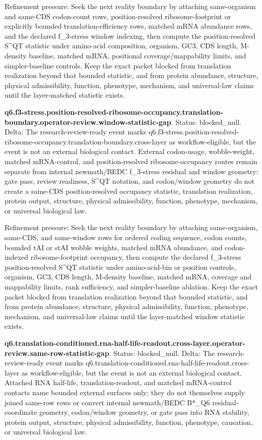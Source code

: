 Refinement pressure: Seek the next reality boundary by attaching same-organism and same-CDS codon-count rows, position-resolved ribosome-footprint or explicitly bounded translation-efficiency rows, matched mRNA abundance rows, and the declared f\_3-stress window indexing, then compute the position-resolved S\textasciicircum{}QT statistic under amino-acid composition, organism, GC3, CDS length, M-density baseline, matched mRNA, positional coverage/mappability limits, and simpler-baseline controls. Keep the exact packet blocked from translation realization beyond that bounded statistic, and from protein abundance, structure, physical admissibility, function, phenotype, mechanism, and universal-law claims until the layer-matched statistic exists.

\textbf{q6.f3-stress.position-resolved-ribosome-occupancy.translation-boundary.operator-review.window-statistic-gap}. Status: blocked\_null. Delta: The research-review-ready event marks q6.f3-stress.position-resolved-ribosome-occupancy.translation-boundary.cross-layer as workflow-eligible, but the event is not an external biological contact. External codon-usage, wobble-weight, matched mRNA-control, and position-resolved ribosome-occupancy routes remain separate from internal newmath/BEDC f\_3-stress residual and window geometry: gate pass, review readiness, S\textasciicircum{}QT notation, and codon/window geometry do not create a same-CDS position-resolved occupancy statistic, translation realization, protein output, structure, physical admissibility, function, phenotype, mechanism, or universal biological law.

Refinement pressure: Seek the next reality boundary by attaching same-organism, same-CDS, and same-window rows for ordered coding sequence, codon counts, bounded tAI or stAI wobble weights, matched mRNA abundance, and codon-indexed ribosome-footprint occupancy, then compute the declared f\_3-stress position-resolved S\textasciicircum{}QT statistic under amino-acid-bin or position controls, organism, GC3, CDS length, M-density baseline, matched mRNA, coverage and mappability limits, rank sufficiency, and simpler-baseline ablation. Keep the exact packet blocked from translation realization beyond that bounded statistic, and from protein abundance, structure, physical admissibility, function, phenotype, mechanism, and universal-law claims until the layer-matched window statistic exists.

\textbf{q6.translation-conditioned.rna-half-life-readout.cross-layer.operator-review.same-row-statistic-gap}. Status: blocked\_null. Delta: The research-review-ready event marks q6.translation-conditioned.rna-half-life-readout.cross-layer as workflow-eligible, but the event is not an external biological contact. Attached RNA half-life, translation-readout, and matched mRNA-control contacts name bounded external surfaces only; they do not themselves supply joined same-row rows or convert internal newmath/BEDC B*\_Q6 residual-coordinate geometry, codon/window geometry, or gate pass into RNA stability, protein output, structure, physical admissibility, function, phenotype, causation, or universal biological law.

